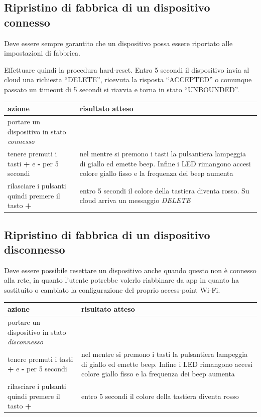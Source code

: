 \documentclass[12pt,a4paper,twoside,titlepage]{book}
\begin{document}
\subsection{Ripristino di fabbrica di un dispositivo connesso}
Deve essere sempre garantito che un dispositivo possa essere riportato alle impostazioni di fabbrica.

Effettuare quindi la procedura hard-reset. Entro 5 secondi il dispositivo invia al cloud una richiesta “DELETE”, ricevuta la risposta “ACCEPTED” o comunque passato un timeout di 5 secondi si riavvia e torna in stato “UNBOUNDED”.
\begin{center}
\begin{tabular}{| p{5cm} | p{5cm} |}
    \hline \textbf{azione} & \textbf{risultato atteso} \\
    \hline portare un dispositivo in stato \textit{connesso} & \\
    \hline tenere premuti i tasti \textbf{+} e \textbf{-} per 5 secondi & nel mentre si premono i tasti la pulsantiera lampeggia di giallo ed emette beep. Infine i LED rimangono accesi colore giallo fisso e la frequenza dei beep aumenta \\
    \hline rilasciare i pulsanti quindi premere il tasto \textbf{+} & entro 5 secondi il colore della tastiera diventa rosso. Su cloud arriva un messaggio \textit{DELETE} \\
    \hline
\end{tabular}
\end{center}

\subsection{Ripristino di fabbrica di un dispositivo disconnesso}

Deve essere possibile resettare un dispositivo anche quando questo non è connesso
alla rete, in quanto l'utente potrebbe volerlo riabbinare da app in quanto ha sostituito
o cambiato la configurazione del proprio access-point Wi-Fi.

\begin{center}
\begin{tabular}{| p{5cm} | p{5cm} |}
    \hline \textbf{azione} & \textbf{risultato atteso} \\
    \hline portare un dispositivo in stato \textit{disconnesso} & \\
    \hline tenere premuti i tasti \textbf{+} e \textbf{-} per 5 secondi & nel mentre si premono i tasti la pulsantiera lampeggia di giallo ed emette beep. Infine i LED rimangono accesi colore giallo fisso e la frequenza dei beep aumenta \\
    \hline rilasciare i pulsanti quindi premere il tasto \textbf{+} & entro 5 secondi il colore della tastiera diventa rosso \\
    \hline
\end{tabular}
\end{center}
\end{document}
